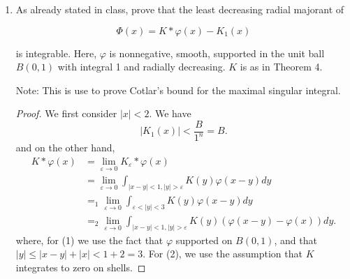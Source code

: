 \begin{enumerate}
\begin{proof}
	Apply Taylor expansion we have
	\[
		\|e^{c |Tf|}\|_{L^1(B)} = \sum_{m=0}^{\infty} \frac{\|c^m |Tf|^m\|_{L_1(B)}}{m!}
		= \sum_{m=0}^{\infty} \frac{c^m}{m!}\|T f\|^m_{L^m(B)}
	.\] 
	Now, apply the fact that
	\[
		\|f\|_{L^p(B)} \uparrow \|f\|_{L^\infty (B)} \quad \text{ as } p \to \infty 
	.\] 
	and that
	\[
		A_{p, n, B} = C_{n, B} (p - 1), \quad p \ge 2
	.\] 
	Thus
	\[
		\|e^{c |Tf|}\|_{L^1(B)} \le 
		K + \sum_{m=2}^{\infty} \frac{c^m}{m!}(m - 1)^m C_{n, B}^m \|f\|^m_{L^\infty (B)}
	.\] 
	To make this converge, we can choose $c$ such that the summand decreases geometrically, that is
	\[
		\frac{1}{m}\log \left( \frac{c^m}{m!}(m - 1)^m C_{n, B}^m \|f\|^m_{L^\infty (B)} \right)  < 0
	.\] 
	Expand,
\[
		\frac{1}{m}\left( m \log (C + \|f\|_{L^\infty (B)} + \log(m - 1) + \log C_{n, B}) - m \log m + m + O(\log m) \right)   < 0
	.\]
	That is,
\[
		 \log C + \log \|f\|_{L^\infty (B)} + \log(m -1) + \log(C_{n, B}) - \log m + 1 + o(1)    < 0
	.\]
	Take $C < \frac{m}{3(m-1) C_{n, B} \|f\|_{L^\infty (B)}}  $ suffices to finish the proof.

\end{proof}

\item 
	As already stated in class, prove that the least decreasing radial majorant of

\[
\Phi(x)=K * \varphi(x)-K_1(x)
\]

is integrable. Here, $\varphi$ is nonnegative, smooth, supported in the unit ball $B(0,1)$ with integral 1 and radially decreasing. $K$ is as in Theorem 4.

Note: This is use to prove Cotlar's bound for the maximal singular integral.

\begin{proof}
	We first consider $|x| < 2$. We have
	\[
		|K_1(x)| < \frac{B}{1^n} = B
	.\] 
	and on the other hand,
	\begin{align*}
		K*\varphi(x)
		&= \lim_{\varepsilon \to 0} K_\varepsilon * \varphi(x)\\
		&= \lim_{\varepsilon \to 0} \int _{|x - y| < 1, |y| > \varepsilon} K(y) \varphi(x -y) dy \\
		&=_1 \lim_{\varepsilon \to 0} \int _{\varepsilon < |y| < 3} K(y) \varphi(x -y) dy \\
		&=_2 \lim_{\varepsilon \to 0} \int _{|x - y| < 1, |y| > \varepsilon} K(y) (\varphi(x -y) - \varphi(x)) dy
	.\end{align*}
	where, for (1) we use the fact that $\varphi$ supported on $B(0,1)$, and that $|y| \le |x - y| + |x| < 1 + 2 = 3$. For (2), we use the assumption that $K$ integrates to zero on shells.


\end{proof}
\end{enumerate}
